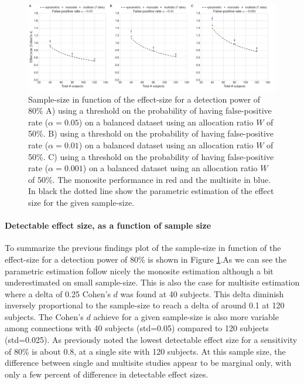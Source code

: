 \documentclass[authoryear]{elsarticle}
\begin{document}
\begin{figure}[tbp]
\centering
\includegraphics[width=\textwidth]{../figures/samplesize_x_effectsize.png}
\caption[]{
Sample-size in function of the effect-size for a detection power of 80\%
A) using a threshold on the probability of having false-positive rate ($\alpha=0.05$) on a balanced dataset using an allocation ratio $W$ of 50\%.
B) using a threshold on the probability of having false-positive rate ($\alpha=0.01$) on a balanced dataset using an allocation ratio $W$ of 50\%.
C) using a threshold on the probability of having false-positive rate ($\alpha=0.001$) on a balanced dataset using an allocation ratio $W$ of 50\%.
The monosite performance in red and the multisite in blue. In black the dotted line show the parametric estimation of the effect size for the given sample-size.
}
\label{fig_sampeffect_curves_alpha001}
\end{figure}

\paragraph{Detectable effect size, as a function of sample size} To summarize the previous findings plot of the sample-size in function of the effect-size for a detection power of 80\% is shown in Figure \ref{fig_sampeffect_curves_alpha001}.As we can see the parametric estimation follow nicely the monosite estimation although a bit underestimated on small sample-size. This is also the case for multisite estimation where a delta of 0.25 Cohen's $d$ was found at 40 subjects. This delta diminish inversely proportional to the sample-size to reach a delta of around 0.1 at 120 subjects. The Cohen's $d$ achieve for a given sample-size is also more variable among connections with 40 subjects (std=0.05) compared to 120 subjects (std=0.025). As previously noted the lowest detectable effect size for a sensitivity of 80\% is about 0.8, at a single site with 120 subjects. At this sample size, the difference between single and multisite studies appear to be marginal only, with only a few percent of difference in detectable effect sizes. 
\end{document}
